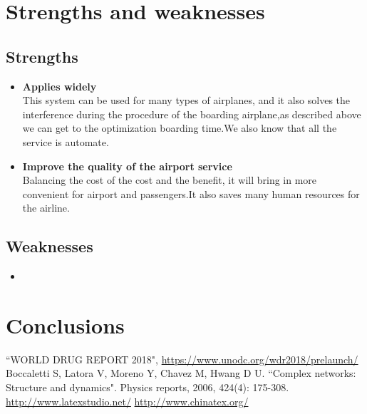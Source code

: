 \documentclass{mcmthesis}
\begin{document}
\section{Strengths and weaknesses}

\subsection{Strengths}
\begin{itemize}
	\item \textbf{Applies widely}\\
	This  system can be used for many types of airplanes, and it also
	solves the interference during  the procedure of the boarding
	airplane,as described above we can get to the  optimization
	boarding time.We also know that all the service is automate.
	\item \textbf{Improve the quality of the airport service}\\
	Balancing the cost of the cost and the benefit, it will bring in
	more convenient  for airport and passengers.It also saves many
	human resources for the airline.
\end{itemize}

\subsection{Weaknesses}
\begin{itemize}
	\item
\end{itemize}

\section{Conclusions}


\begin{thebibliography}{99}
	 ``WORLD DRUG REPORT 2018", \url{https://www.unodc.org/wdr2018/prelaunch/}
	 Boccaletti S, Latora V, Moreno Y, Chavez M, Hwang D U. ``Complex networks: Structure and dynamics". Physics reports, 2006, 424(4): 175-308.
	\url{http://www.latexstudio.net/}
	\url{http://www.chinatex.org/}
\end{thebibliography}
\end{document}
